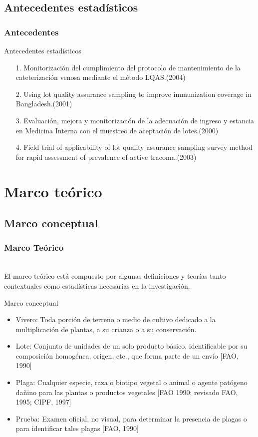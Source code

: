 \documentclass[10pt]{beamer}
\begin{document}
\subsection{Antecedentes estadísticos}
\begin{frame}
\frametitle{Antecedentes}
\begin{block}{Antecedentes estadísticos}
\begin{itemize}
\justifying
\item[1.]Monitorización del cumplimiento del protocolo de mantenimiento de la cateterización venosa mediante el método LQAS.(2004)\cite{AE1}
\item[2.]Using lot quality assurance sampling to improve immunization coverage in Bangladesh.(2001)\cite{AE2}
\item[3.]Evaluación, mejora y monitorización de la adecuación de ingreso y estancia en Medicina Interna con el muestreo de aceptación de lotes.(2000)\cite{AE3}
\item[4.]Field trial of applicability of lot quality assurance sampling survey method for rapid assessment of prevalence of active tracoma.(2003)\cite{AE4}
\end{itemize}
\end{block}
\end{frame}

\section{Marco teórico}
\subsection{Marco conceptual}
\begin{frame}
\frametitle{Marco Teórico}
~\\El marco teórico está compuesto por algunas definiciones y teorías tanto contextuales como estadísticas necesarias en la investigación.
\begin{block}{Marco conceptual}
\begin{itemize}
\justifying
\item Vivero: Toda porción de terreno o medio de cultivo dedicado a la multiplicación de plantas, a su crianza o a su conservación.
\item Lote: Conjunto de unidades de un solo producto básico, identificable por su composición homogénea, origen, etc., que forma parte de un envío [FAO, 1990] 
\item Plaga: Cualquier especie, raza o biotipo vegetal o animal o agente patógeno dañino para las plantas o productos vegetales [FAO 1990; revisado FAO, 1995; CIPF, 1997] 
\item Prueba: Examen oficial, no visual, para determinar la presencia de plagas o para identificar tales plagas [FAO, 1990] 
\end{itemize}
\end{block}

\end{frame}
\end{document}
